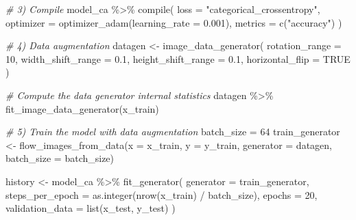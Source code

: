 \documentclass[
]{article}
\newenvironment{Shaded}{\begin{snugshade}}{\end{snugshade}}
\newcommand{\AttributeTok}[1]{\textcolor[rgb]{0.77,0.63,0.00}{#1}}
\newcommand{\CommentTok}[1]{\textcolor[rgb]{0.56,0.35,0.01}{\textit{#1}}}
\newcommand{\ConstantTok}[1]{\textcolor[rgb]{0.00,0.00,0.00}{#1}}
\newcommand{\DecValTok}[1]{\textcolor[rgb]{0.00,0.00,0.81}{#1}}
\newcommand{\FloatTok}[1]{\textcolor[rgb]{0.00,0.00,0.81}{#1}}
\newcommand{\FunctionTok}[1]{\textcolor[rgb]{0.00,0.00,0.00}{#1}}
\newcommand{\NormalTok}[1]{#1}
\newcommand{\OtherTok}[1]{\textcolor[rgb]{0.56,0.35,0.01}{#1}}
\newcommand{\SpecialCharTok}[1]{\textcolor[rgb]{0.00,0.00,0.00}{#1}}
\newcommand{\StringTok}[1]{\textcolor[rgb]{0.31,0.60,0.02}{#1}}
\begin{document}
\begin{Shaded}
\begin{Highlighting}[]
\CommentTok{\# 3) Compile}
\NormalTok{model\_ca }\SpecialCharTok{\%\textgreater{}\%} \FunctionTok{compile}\NormalTok{(}
  \AttributeTok{loss =} \StringTok{"categorical\_crossentropy"}\NormalTok{,}
  \AttributeTok{optimizer =} \FunctionTok{optimizer\_adam}\NormalTok{(}\AttributeTok{learning\_rate =} \FloatTok{0.001}\NormalTok{),}
  \AttributeTok{metrics =} \FunctionTok{c}\NormalTok{(}\StringTok{"accuracy"}\NormalTok{)}
\NormalTok{)}

\CommentTok{\# 4) Data augmentation}
\NormalTok{datagen }\OtherTok{\textless{}{-}} \FunctionTok{image\_data\_generator}\NormalTok{(}
  \AttributeTok{rotation\_range =} \DecValTok{10}\NormalTok{,}
  \AttributeTok{width\_shift\_range =} \FloatTok{0.1}\NormalTok{,}
  \AttributeTok{height\_shift\_range =} \FloatTok{0.1}\NormalTok{,}
  \AttributeTok{horizontal\_flip =} \ConstantTok{TRUE}
\NormalTok{)}

\CommentTok{\# Compute the data generator internal statistics}
\NormalTok{datagen }\SpecialCharTok{\%\textgreater{}\%} \FunctionTok{fit\_image\_data\_generator}\NormalTok{(x\_train)}

\CommentTok{\# 5) Train the model with data augmentation}
\NormalTok{batch\_size }\OtherTok{=} \DecValTok{64}
\NormalTok{train\_generator }\OtherTok{\textless{}{-}} \FunctionTok{flow\_images\_from\_data}\NormalTok{(}\AttributeTok{x =}\NormalTok{ x\_train, }\AttributeTok{y =}\NormalTok{ y\_train, }\AttributeTok{generator =}\NormalTok{ datagen, }\AttributeTok{batch\_size =}\NormalTok{ batch\_size)}

\NormalTok{history }\OtherTok{\textless{}{-}}\NormalTok{ model\_ca }\SpecialCharTok{\%\textgreater{}\%} \FunctionTok{fit\_generator}\NormalTok{(}
  \AttributeTok{generator =}\NormalTok{ train\_generator,}
  \AttributeTok{steps\_per\_epoch =} \FunctionTok{as.integer}\NormalTok{(}\FunctionTok{nrow}\NormalTok{(x\_train) }\SpecialCharTok{/}\NormalTok{ batch\_size),}
  \AttributeTok{epochs =} \DecValTok{20}\NormalTok{,}
  \AttributeTok{validation\_data =} \FunctionTok{list}\NormalTok{(x\_test, y\_test)}
\NormalTok{)}
\end{Highlighting}
\end{Shaded}
\end{document}
